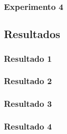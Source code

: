 \documentclass[11pt,letterpaper]{article}
\begin{document}
\subsubsection{Experimento 4}

\subsection{Resultados}
\subsubsection{Resultado 1}
\subsubsection{Resultado 2}
\subsubsection{Resultado 3}
\subsubsection{Resultado 4}




\end{document}
